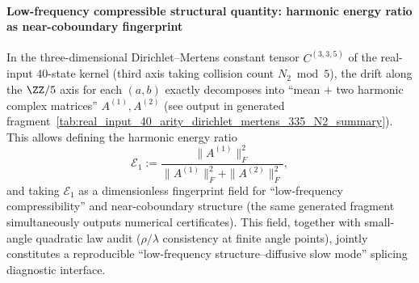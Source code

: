 \paragraph{Low-frequency compressible structural quantity: harmonic energy ratio as near-coboundary fingerprint}
In the three-dimensional Dirichlet–Mertens constant tensor \(C^{(3,3,5)}\) of the real-input 40-state kernel (third axis taking collision count \(N_2\bmod 5\)), the drift along the \(\ZZ/5\) axis for each \((a,b)\) exactly decomposes into ``mean \(+\) two harmonic complex matrices'' \(A^{(1)},A^{(2)}\) (see output in generated fragment~\ref{tab:real_input_40_arity_dirichlet_mertens_335_N2_summary}).
This allows defining the harmonic energy ratio
\[
\mathcal{E}_1:=\frac{\|A^{(1)}\|_F^2}{\|A^{(1)}\|_F^2+\|A^{(2)}\|_F^2},
\]
and taking \(\mathcal{E}_1\) as a dimensionless fingerprint field for ``low-frequency compressibility'' and near-coboundary structure (the same generated fragment simultaneously outputs numerical certificates).
This field, together with small-angle quadratic law audit (\(\rho/\lambda\) consistency at finite angle points), jointly constitutes a reproducible ``low-frequency structure–diffusive slow mode'' splicing diagnostic interface.

